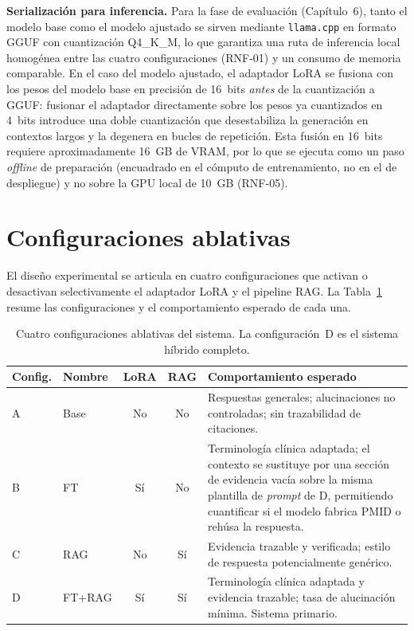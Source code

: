 \documentclass[11pt,a4paper,spanish]{book}
\numberwithin{equation}{chapter}
\numberwithin{figure}{chapter}
\begin{document}
\textbf{Serialización para inferencia.} Para la fase de evaluación (Capítulo~6), tanto el modelo base como el modelo ajustado se sirven mediante \texttt{llama.cpp} en formato GGUF con cuantización Q4\_K\_M, lo que garantiza una ruta de inferencia local homogénea entre las cuatro configuraciones (RNF-01) y un consumo de memoria comparable. En el caso del modelo ajustado, el adaptador LoRA se fusiona con los pesos del modelo base en precisión de 16~bits \emph{antes} de la cuantización a GGUF: fusionar el adaptador directamente sobre los pesos ya cuantizados en 4~bits introduce una doble cuantización que desestabiliza la generación en contextos largos y la degenera en bucles de repetición. Esta fusión en 16~bits requiere aproximadamente 16~GB de VRAM, por lo que se ejecuta como un paso \textit{offline} de preparación (encuadrado en el cómputo de entrenamiento, no en el de despliegue) y no sobre la GPU local de 10~GB (RNF-05).

\section{Configuraciones ablativas}
\label{sec:c5_ablation}

El diseño experimental se articula en cuatro configuraciones que activan o desactivan selectivamente el adaptador LoRA y el pipeline RAG. La Tabla~\ref{tab:c5_ablations} resume las configuraciones y el comportamiento esperado de cada una.

\begin{table}[h]
\centering
\begin{tabular}{|l|l|c|c|p{}|}
\hline
\textbf{Config.} & \textbf{Nombre} & \textbf{LoRA} & \textbf{RAG} & \textbf{Comportamiento esperado} \\
\hline
A & Base & No & No & Respuestas generales; alucinaciones no controladas; sin trazabilidad de citaciones. \\
\hline
B & FT & Sí & No & Terminología clínica adaptada; el contexto se sustituye por una sección de evidencia vacía sobre la misma plantilla de \textit{prompt} de D, permitiendo cuantificar si el modelo fabrica PMID o rehúsa la respuesta. \\
\hline
C & RAG & No & Sí & Evidencia trazable y verificada; estilo de respuesta potencialmente genérico. \\
\hline
D & FT+RAG & Sí & Sí & Terminología clínica adaptada y evidencia trazable; tasa de alucinación mínima. Sistema primario. \\
\hline
\end{tabular}
\caption{Cuatro configuraciones ablativas del sistema. La configuración~D es el sistema híbrido completo.}
\label{tab:c5_ablations}
\end{table}
\end{document}

